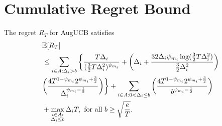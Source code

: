 \section{Cumulative Regret Bound}

\begin{theorem}
\label{proofTheorem:Prop:1}
The regret $R_T$ for AugUCB satisfies
\begin{align*}
&\mathbb{E} [R_{T}]\\
& \leq \sum\limits_{i\in A:\Delta_{i} > b}\bigg\lbrace \dfrac{T\Delta_{i}}{( \frac{3}{2} T\Delta_i^{2})^{\psi_{m_i}}}
  + \left( \Delta_i +\dfrac{32\Delta_i\psi_{m_i}\log( \frac{3}{2} T\Delta_i^2)}{\frac{3}{2} \Delta_i^2}\right)\\
  & \bigg(\dfrac{4T^{1-\psi_{m_i}}2^{\psi_{m_i}+\frac{3}{2}}}{\Delta_{i}^{\psi_{m_i}-\frac{1}{2}}} \bigg)\bigg \rbrace +\sum_{i\in A: 0 < \Delta_{i} \leq b}\bigg(\dfrac{4T^{1-\psi_{m_i}}2^{\psi_{m_i}+\frac{3}{2}}}{b^{\psi_{m_i}-\frac{1}{2}}} \bigg) \\
  & + \max_{\substack{i\in A: \\ \Delta_{i}\leq b}}\Delta_{i}T, \text{  for all $b\geq\sqrt{\frac{e}{T}}$}. 
\end{align*} 
\end{theorem}



